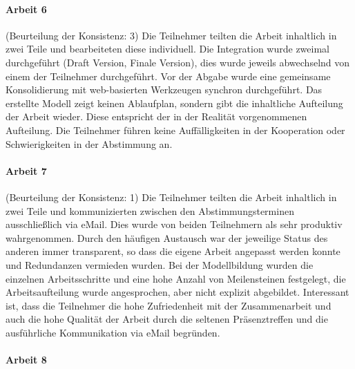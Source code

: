 
\paragraph{Arbeit 6} %
\label{par:arbeit_6}

(Beurteilung der Konsistenz: 3) Die Teilnehmer teilten die Arbeit inhaltlich in zwei Teile und bearbeiteten diese individuell. Die Integration wurde zweimal durchgeführt (Draft Version, Finale Version), dies wurde jeweils abwechselnd von einem der Teilnehmer durchgeführt. Vor der Abgabe wurde eine gemeinsame Konsolidierung mit web-basierten Werkzeugen synchron durchgeführt. Das erstellte Modell zeigt keinen Ablaufplan, sondern gibt die inhaltliche Aufteilung der Arbeit wieder. Diese entspricht der in der Realität vorgenommenen Aufteilung. Die Teilnehmer führen keine Auffälligkeiten in der Kooperation oder Schwierigkeiten in der Abstimmung an.


\paragraph{Arbeit 7} %
\label{par:arbeit_7}

(Beurteilung der Konsistenz: 1) Die Teilnehmer teilten die Arbeit inhaltlich in zwei Teile und kommunizierten zwischen den Abstimmungsterminen ausschließlich via eMail. Dies wurde von beiden Teilnehmern als sehr produktiv wahrgenommen. Durch den häufigen Austausch war der jeweilige Status des anderen immer transparent, so dass die eigene Arbeit angepasst werden konnte und Redundanzen vermieden wurden. Bei der Modellbildung wurden die einzelnen Arbeitsschritte und eine hohe Anzahl von Meilensteinen festgelegt, die Arbeitsaufteilung wurde angesprochen, aber nicht explizit abgebildet. Interessant ist, dass die Teilnehmer die hohe Zufriedenheit mit der Zusammenarbeit und auch die hohe Qualität der Arbeit durch die seltenen Präsenztreffen und die ausführliche Kommunikation via eMail begründen.


\paragraph{Arbeit 8} %
\label{par:arbeit_8}

